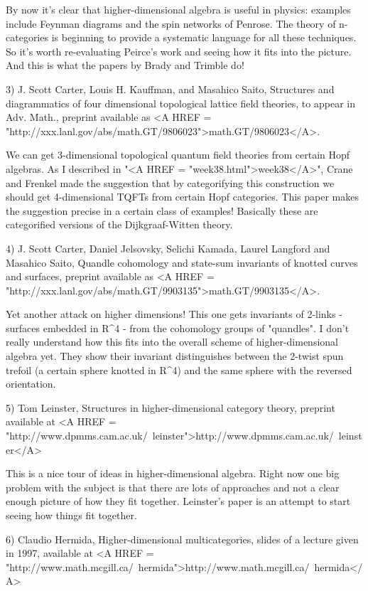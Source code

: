 By now it's clear that higher-dimensional algebra is useful in physics:
examples include Feynman diagrams and the spin networks of Penrose.  
The theory of n-categories is beginning to provide a systematic language
for all these techniques.  So it's worth re-evaluating Peirce's work and
seeing how it fits into the picture.  And this is what the papers by
Brady and Trimble do!

3) J. Scott Carter, Louis H. Kauffman, and Masahico Saito, Structures
and diagrammatics of four dimensional topological lattice field theories,
to appear in Adv. Math., preprint available as 
<A HREF = "http://xxx.lanl.gov/abs/math.GT/9806023">math.GT/9806023</A>.

We can get 3-dimensional topological quantum field theories from certain
Hopf algebras.  As I described in "<A HREF = "week38.html">week38</A>", Crane and Frenkel made the 
suggestion that by categorifying this construction we should get 
4-dimensional TQFTs from certain Hopf categories.  This paper makes the
suggestion precise in a certain class of examples!  Basically these are
categorified versions of the Dijkgraaf-Witten theory.

4) J. Scott Carter, Daniel Jelsovsky, Selichi Kamada, Laurel Langford
and Masahico Saito, Quandle cohomology and state-sum invariants of
knotted curves and surfaces, preprint available as 
<A HREF = "http://xxx.lanl.gov/abs/math.GT/9903135">math.GT/9903135</A>.

Yet another attack on higher dimensions!  This one gets invariants of
2-links - surfaces embedded in R^4 - from the cohomology groups of
"quandles".  I don't really understand how this fits into the overall
scheme of higher-dimensional algebra yet.  They show their invariant
distinguishes between the 2-twist spun trefoil (a certain sphere knotted
in R^4) and the same sphere with the reversed orientation.

5) Tom Leinster, Structures in higher-dimensional category theory,
preprint available at <A HREF = "http://www.dpmms.cam.ac.uk/~leinster">http://www.dpmms.cam.ac.uk/~leinster</A>

This is a nice tour of ideas in higher-dimensional algebra.  Right now
one big problem with the subject is that there are lots of approaches
and not a clear enough picture of how they fit together.  Leinster's
paper is an attempt to start seeing how things fit together.  

6) Claudio Hermida, Higher-dimensional multicategories, slides of
a lecture given in 1997, available at <A HREF = "http://www.math.mcgill.ca/~hermida">http://www.math.mcgill.ca/~hermida</A>

